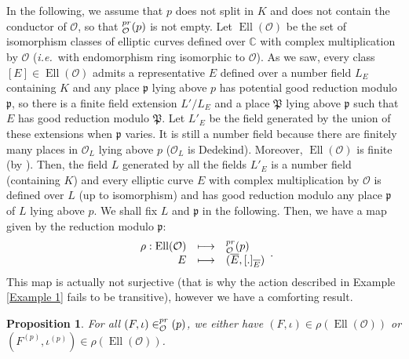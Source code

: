 \documentclass[a4paper,10pt,notitlepage]{report}
\theoremstyle{definition}
\theoremstyle{plain}
\newtheorem{Proposition}[Definition]{Proposition}
\theoremstyle{definition}
\newcommand{\ie}{\emph{i.e.}\ }
\newcommand{\C}{\mathbb{C}}
\newcommand{\mO}{\mathcal{O}}
\renewcommand{\(}{\left(}
\renewcommand{\)}{\right)}
\newcommand{\mf}[1]{\mathfrak{#1}}
\newcommand{\mfp}{\mathfrak{p}}
\let\SS\relax
\DeclareMathOperator{\SS}{SS}
\DeclareMathOperator{\Ell}{Ell}
\begin{document}
In the following, we assume that $p$ does not split in $K$ and does not contain the conductor of $\mO$, so that $\SS_\mO^{pr}(p)$ is not empty.  Let $\Ell(\mO)$ be the set of isomorphism classes of elliptic curves defined over $\C$ with complex multiplication by $\mO$ (\ie  with endomorphism ring isomorphic to $ \mO$). As we saw, every class $[E]\in\Ell(\mO)$ admits a representative $E$ defined over a number field $L_E$ containing $K$ and any place $\mfp$ lying above $p$ has potential good reduction modulo $\mfp$, so there is a finite field extension $L'/L_E$ and a place $\mf{P}$ lying above $\mfp$ such that $E$ has good reduction modulo $\mf{P}$. Let $L'_E$ be the field generated by the union of these extensions when $\mfp$ varies.  It is still a number field because there are finitely many places in $\mO_L$ lying above $p$ ($\mO_L$ is Dedekind).  Moreover,  $\Ell(\mO)$ is finite (by \cite[Proposition II.2.1.(b)]{Silverman2}). Then, the field $L$ generated by all the fields $L'_E$ is a number field (containing $K$) and every elliptic curve $E$ with complex multiplication by $\mO$ is defined over $L$ (up to isomorphism) and has good reduction modulo any place $\mfp$ of $L$ lying above $p$.  We shall fix $L$ and $\mfp$ in the following.  Then, we have a map given by the reduction modulo $\mfp$:
\[\begin{array}{rcl} \rho : \Ell(\mO)& \longmapsto& \SS_\mO^{pr}(p)\\ 
E&\longmapsto&(\overline{E},[.]_{\overline{E}})
\end{array}.\]
This map is actually not surjective (that is why the action described in Example \ref{Example 1} fails to be transitive), however we have a comforting result.

\begin{Proposition}\label{Proposition 6}
For all $(F,\iota)\in\SS_\mO^{pr}(p)$, we either have $(F,\iota)\in\rho(\Ell(\mO))$ or $(F^{(p)},\iota^{(p)})\in\rho(\Ell(\mO))$.
\end{Proposition}
\end{document}
